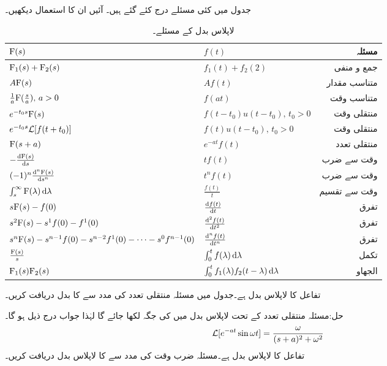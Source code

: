 جدول  میں کئی مسئلے درج کئے گئے ہیں۔ آئیں ان کا استعمال دیکھیں۔
\begin{table}
\caption{لاپلاس بدل کے مسئلے۔}
\label{جدول_لاپلاس_مسئلے}
\centering
\begin{tabular}{l l r}
 ${{\textup{F}}}(s)$&$f(t)$ & مسئلہ\Bstrut \\
\hline
 ${{\textup{F}}}_1(s)+{{\textup{F}}}_2(s)$&$f_1(t)+f_2(2)$ & جمع و منفی\Tstrut \\
 $A{{\textup{F}}}(s)$&$Af(t)$& متناسب مقدار\\[2ex] 
$\frac{1}{a}{{\textup{F}}}(\frac{s}{a}),\, a>0$ & $ f(at)$ & متناسب وقت\\[2ex] 
 $e^{-t_0 s}{{\textup{F}}}(s)$&$f(t-t_0) u(t-t_0), \, t_0>0$  & منتقلی وقت\\[2ex] 
 $e^{-t_0 s}\mathcal{L} [f(t+t_0)]$&$f(t) u(t-t_0), \, t_0>0$  & منتقلی وقت\\[2ex] 
${{\textup{F}}}(s+a)$& $e^{-at} f(t)$  & منتقلی تعدد\\[2ex] 
$-\frac{\dif \bF(s)}{\dif s}$ & $t f(t)$  & وقت سے ضرب\\[2ex] 
$(-1)^n\frac{\dif{^n} \bF(s)}{\dif s^n}$ & $t^n f(t)$  & وقت سے ضرب\\[2ex] 
$\int_s^{\infty} \bF(\lambda) \dif \lambda $ & $\frac{f(t)}{t}$  & وقت سے تقسیم\\[2ex] 
$s {{\textup{F}}}(s)-f(0)$ & $\frac{\dif f(t)}{\dif t}$  & تفرق\\[2ex] 
$s^2 {{\textup{F}}}(s)-s^1 f(0)- f^1(0)$ & $\frac{\dif{^2} f(t)}{\dif t^2}$  & تفرق\\[2ex] 
$s^n {{\textup{F}}}(s)-s^{n-1}f(0)-s^{n-2} f^1(0)-\cdots -s^0 f^{n-1}(0)$ & $\frac{\dif{^n} f(t)}{\dif t^n}$  & تفرق\\[2ex] 
$\frac{{{\textup{F}}}(s)}{s}$ & $\int_0^t f(\lambda) \dif \lambda$  & تکمل\\[2ex] 
${{\textup{F}}}_1(s) {{\textup{F}}}_2(s)$ & $\int_0^t f_1(\lambda) f_2(t-\lambda) \dif \lambda$  & الجھاو
\end{tabular}
\end{table}
تفاعل  کا لاپلاس بدل  ہے۔جدول  میں مسئلہ منتقلی تعدد کی مدد سے  کا بدل دریافت کریں۔

حل:مسئلہ منتقلی تعدد کے تحت لاپلاس بدل میں  کی جگہ   لکھا جائے گا لہٰذا جواب درج ذیل ہو گا۔
\begin{align*}
\mathcal{L}[e^{-at} \sin \omega t]=\frac{\omega}{(s+a)^2+\omega^2}
\end{align*}
تفاعل  کا لاپلاس بدل  ہے۔مسئلہ ضرب وقت کی مدد سے  کا لاپلاس بدل دریافت کریں۔

